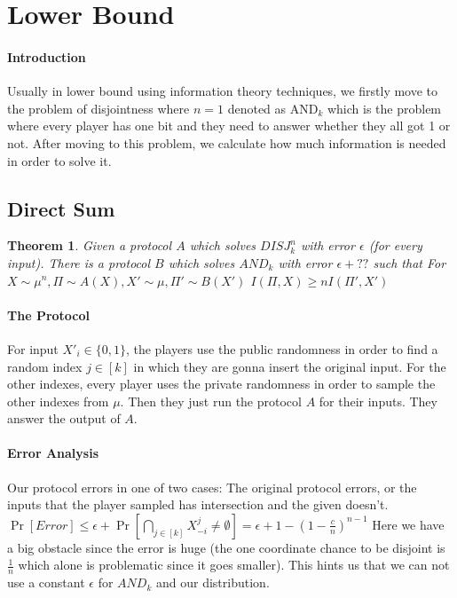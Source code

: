 \documentclass{article}
\theoremstyle{plain}
\newtheorem{theorem}{Theorem}[section]
\begin{document}
\section{Lower Bound}
\paragraph{Introduction}
Usually in lower bound using information theory techniques, we firstly move to the problem of disjointness where $n=1$ denoted as $\text{AND}_k$ which is the problem where every player has one bit and they need to answer whether they all got 1 or not. After moving to this problem, we calculate how much information is needed in order to solve it.
\subsection{Direct Sum}
\begin{theorem}
Given a protocol $A$ which solves $DISJ^n_k$ with error $\epsilon$ (for every input). There is a protocol $B$ which solves $AND_k$ with error $\epsilon + ??$ such that \newline
For $X \sim \mu^n, \Pi \sim A(X), X' \sim \mu, \Pi ' \sim B(X') $ \newline
$I(\Pi, X) \geq n I(\Pi ', X')$
\end{theorem}
\paragraph{The Protocol}
For input $X'_i \in \{0, 1\}$, the players use the public randomness in order to find a random index $j \in [k]$ in which they are gonna insert the original input. For the other indexes, every player uses the private randomness in order to sample the other indexes from $\mu$. Then they just run the protocol $A$ for their inputs. They answer the output of $A$. 

\paragraph{Error Analysis}
Our protocol errors in one of two cases: The original protocol errors, or the inputs that the player sampled has intersection and the given doesn't. \newline
$\Pr[Error] \leq \epsilon + \Pr[\underset{j \in [k]}{\bigcap } X^j_{-i} \neq \emptyset] = \epsilon + 1 - (1 - \frac{c}{n})^{n-1}$ \newline
Here we have a big obstacle since the error is huge (the one coordinate chance to be disjoint is $\frac{1}{n}$ which alone is problematic since it goes smaller). This hints us that we can not use a constant $\epsilon$ for $AND_k$ and our distribution.
\end{document}
